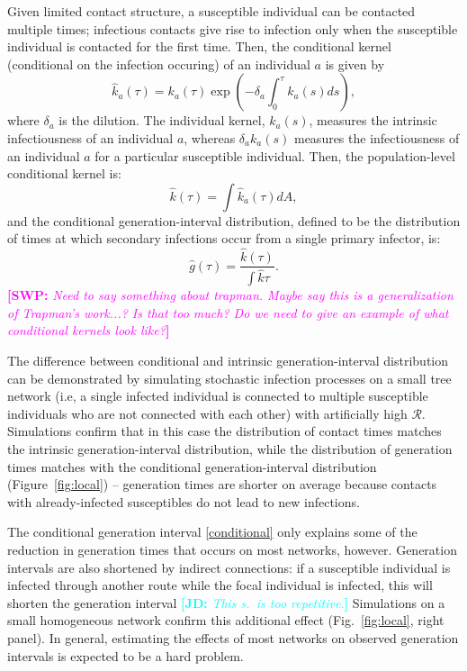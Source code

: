 \documentclass[12pt]{article}
\newcommand{\fref}[1]{Fig.~\ref{fig:#1}}
\newcommand{\RR}{\ensuremath{{\mathcal R}}}
\newcommand{\comment}[3]{\textcolor{#1}{\textbf{[#2: }\textsl{#3}\textbf{]}}}
\newcommand{\jd}[1]{\comment{cyan}{JD}{#1}}
\newcommand{\swp}[1]{\comment{magenta}{SWP}{#1}}
\begin{document}
Given limited contact structure, a susceptible individual can be contacted multiple times;
infectious contacts give rise to infection only when the susceptible individual is contacted for the first time.
Then, the conditional kernel (conditional on the infection occuring) of an individual $a$ is given by
\begin{equation}
\hat{k}_a(\tau) = k_a(\tau) \exp \left(- \delta_a \int_0^\tau k_a(s) ds\right),
\end{equation}
where $\delta_a$ is the dilution.
The individual kernel, $k_a(s)$, measures the intrinsic infectiousness of an individual $a$,
whereas $\delta_a k_a(s)$ measures the infectiousness of an individual $a$ for a particular susceptible individual.
Then, the population-level conditional kernel is:
\begin{equation}
\hat{k}(\tau) = \int \hat{k}_a(\tau) dA,
\end{equation}
and the conditional generation-interval distribution, defined to be the distribution of times at which secondary infections occur from a single primary infector, is:
\begin{equation}
\hat{g}(\tau) = \frac{\hat{k}(\tau)}{\int \hat{k} \tau}.
\label{eq:conditional}
\end{equation}
\swp{Need to say something about trapman. Maybe say this is a generalization of Trapman's work...? Is that too much? Do we need to give an example of what conditional kernels look like?}

The difference between conditional and intrinsic generation-interval distribution can be demonstrated by simulating stochastic infection processes on a small tree network (i.e, a single infected individual is connected to multiple susceptible individuals who are not connected with each other) with artificially high $\RR$.
Simulations confirm that in this case the distribution of contact times matches the intrinsic generation-interval distribution, while the distribution of generation times matches with the conditional generation-interval distribution (Figure~\ref{fig:local}) -- generation times are shorter on average because contacts with already-infected susceptibles do not lead to new infections.

The conditional generation interval \eqref{conditional} only explains some of the reduction in generation times that occurs on most networks, however.
Generation intervals are also shortened by indirect connections: if a susceptible individual is infected through another route while the focal individual is infected, this will shorten the generation interval \jd{This s.~is too repetitive.}
Simulations on a small homogeneous network confirm this additional effect (\fref{local}, right panel). 
In general, estimating the effects of most networks on observed generation intervals is expected to be a hard problem. 
\end{document}
